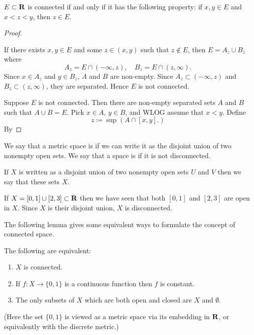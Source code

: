 \begin{proposition}
$E\subset\mathbf R$ is connected if and only if it has the following property: if $x,y\in E$ and $x<z<y$, then $z\in E$.
\end{proposition}

\begin{proof} \

\fbox{$\impliedby$} If there exists $x,y\in E$ and some $z\in(x,y)$ such that $z\notin E$, then $E=A_z\cup B_z$ where
\[ A_z=E\cap(-\infty,z), \quad B_z=E\cap(z,\infty). \]
Since $x\in A_z$ and $y\in B_z$, $A$ and $B$ are non-empty. Since $A_z\subset(-\infty,z)$ and $B_z\subset(z,\infty)$, they are separated. Hence $E$ is not connected.

\fbox{$\implies$} Suppose $E$ is not connected. Then there are non-empty separated sets $A$ and $B$ such that $A\cup B=E$. Pick $x\in A$, $y\in B$, and WLOG assume that $x<y$. Define
\[z\coloneqq\sup(A\cap[x,y].)\]
By 
\end{proof}

\begin{definition}
We say that a metric space is  if we can write it as the disjoint union of two nonempty open sets. We say that a space is  if it is not disconnected.
\end{definition}

If $X$ is written as a disjoint union of two nonempty open sets $U$ and $V$ then we say that these sets  $X$.

\begin{example}
If $X=[0,1]\cup[2,3]\subset\mathbf R$ then we have seen that both $[0,1]$ and $[2,3]$ are open in $X$. Since $X$ is their disjoint union, $X$ is disconnected.
\end{example}

The following lemma gives some equivalent ways to formulate the concept of connected space.

\begin{lemma}
The following are equivalent:
\begin{enumerate}[label=(\roman*)]
\item $X$ is connected.
\item If $f:X\to\{0,1\}$ is a continuous function then $f$ is constant.
\item The only subsets of $X$ which are both open and closed are $X$ and $\emptyset$.
\end{enumerate}
(Here the set $\{0,1\}$ is viewed as a metric space via its embedding in $\mathbf R$, or equivalently with the discrete metric.)
\end{lemma}

